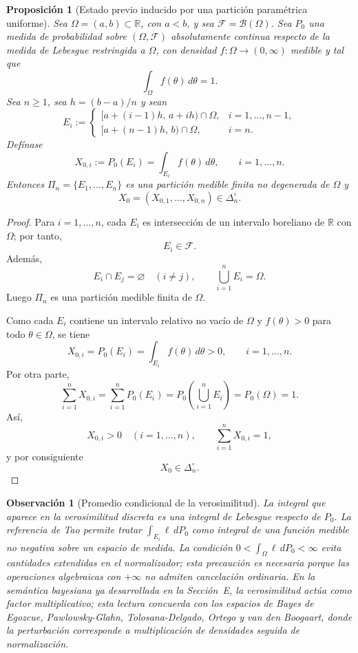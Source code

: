 ﻿\documentclass[12pt]{article}
\newtheorem{proposicion}{Proposición}[section]
\newtheorem{observacion}{Observación}[section]
\begin{document}
\begin{proposicion}[Estado previo inducido por una partición paramétrica uniforme]\label{prop:estado_parametrico_simplex}
Sea $\Omega=(a,b)\subset\mathbb R$, con $a<b$, y sea $\mathcal F=\mathcal B(\Omega)$. Sea $P_0$ una medida de probabilidad sobre $(\Omega,\mathcal F)$ absolutamente continua respecto de la medida de Lebesgue restringida a $\Omega$, con densidad $f:\Omega\to(0,\infty)$ medible y tal que
\[
\int_\Omega f(\theta)\,d\theta=1.
\]
Sea $n\ge 1$, sea $h=(b-a)/n$ y sean
\[
E_i:=
\begin{cases}
[a+(i-1)h,\,a+ih)\cap\Omega, & i=1,\dots,n-1,\\[4pt]
[a+(n-1)h,\,b)\cap\Omega, & i=n.
\end{cases}
\]
Defínase
\[
X_{0,i}:=P_0(E_i)=\int_{E_i}f(\theta)\,d\theta,
\qquad i=1,\dots,n.
\]
Entonces $\Pi_n=\{E_1,\dots,E_n\}$ es una partición medible finita no degenerada de $\Omega$ y
\[
X_0=(X_{0,1},\dots,X_{0,n})\in\Delta_n^\circ.
\]
\end{proposicion}

\begin{proof}
Para $i=1,\dots,n$, cada $E_i$ es intersección de un intervalo boreliano de $\mathbb R$ con $\Omega$; por tanto,
\[
E_i\in\mathcal F.
\]
Además,
\[
E_i\cap E_j=\varnothing\quad (i\ne j),
\qquad
\bigcup_{i=1}^n E_i=\Omega.
\]
Luego $\Pi_n$ es una partición medible finita de $\Omega$.

Como cada $E_i$ contiene un intervalo relativo no vacío de $\Omega$ y $f(\theta)>0$ para todo $\theta\in\Omega$, se tiene
\[
X_{0,i}
=P_0(E_i)
=\int_{E_i}f(\theta)\,d\theta
>0,
\qquad i=1,\dots,n.
\]
Por otra parte,
\[
\sum_{i=1}^n X_{0,i}
=
\sum_{i=1}^n P_0(E_i)
=
P_0\!\left(\bigcup_{i=1}^n E_i\right)
=
P_0(\Omega)
=1.
\]
Así,
\[
X_{0,i}>0\quad (i=1,\dots,n),
\qquad
\sum_{i=1}^nX_{0,i}=1,
\]
y por consiguiente
\[
X_0\in\Delta_n^\circ.
\]
\end{proof}

\begin{observacion}[Promedio condicional de la verosimilitud]
La integral que aparece en la verosimilitud discreta es una integral de Lebesgue respecto de $P_0$. La referencia de Tao permite tratar $\int_{E_i}\ell\,dP_0$ como integral de una función medible no negativa sobre un espacio de medida. La condición $0<\int_\Omega \ell\,dP_0<\infty$ evita cantidades extendidas en el normalizador; esta precaución es necesaria porque las operaciones algebraicas con $+\infty$ no admiten cancelación ordinaria. En la semántica bayesiana ya desarrollada en la Sección~E, la verosimilitud actúa como factor multiplicativo; esta lectura concuerda con los espacios de Bayes de Egozcue, Pawlowsky-Glahn, Tolosana-Delgado, Ortego y van den Boogaart, donde la perturbación corresponde a multiplicación de densidades seguida de normalización.
\end{observacion}
\end{document}
